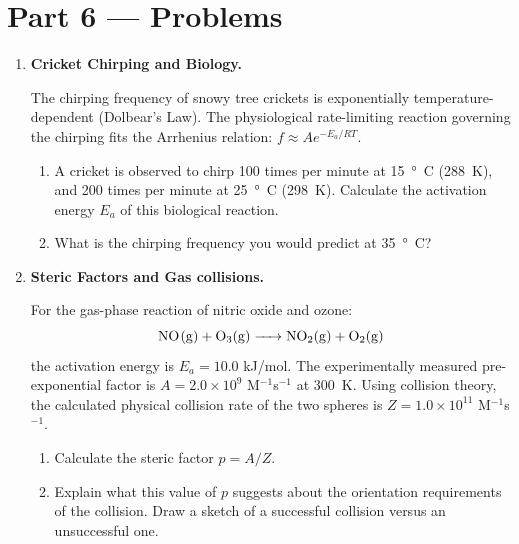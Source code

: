 \documentclass[12pt, a4paper]{book}
\begin{document}
\newpage

\section{Part 6 --- Problems}

\begin{problembox}
\begin{enumerate}[label=\textbf{P\arabic*.}]
  \item \textbf{Cricket Chirping and Biology.}
  
        The chirping frequency of snowy tree crickets is exponentially temperature-dependent (Dolbear's Law). The physiological rate-limiting reaction governing the chirping fits the Arrhenius relation: $f \approx A e^{-E_a/RT}$.
        \begin{enumerate}[label=(\alph*)]
          \item A cricket is observed to chirp 100 times per minute at \SI{15}{\degree C} (\SI{288}{K}), and 200 times per minute at \SI{25}{\degree C} (\SI{298}{K}). Calculate the activation energy $E_a$ of this biological reaction.
          \item What is the chirping frequency you would predict at \SI{35}{\degree C}?
        \end{enumerate}

  \item \textbf{Steric Factors and Gas collisions.}
  
        For the gas-phase reaction of nitric oxide and ozone:
        \[
          \ce{NO(g) + O3(g) -> NO2(g) + O2(g)}
        \]
        the activation energy is $E_a = 10.0$ kJ/mol. The experimentally measured pre-exponential factor is $A = 2.0 \times 10^9$ M$^{-1}$s$^{-1}$ at \SI{300}{K}.
        Using collision theory, the calculated physical collision rate of the two spheres is $Z = 1.0 \times 10^{11}$ M$^{-1}$s$^{-1}$.
        \begin{enumerate}[label=(\alph*)]
          \item Calculate the steric factor $p = A/Z$.
          \item Explain what this value of $p$ suggests about the orientation requirements of the collision. Draw a sketch of a successful collision versus an unsuccessful one.
        \end{enumerate}
\end{enumerate}
\end{problembox}
\end{document}
